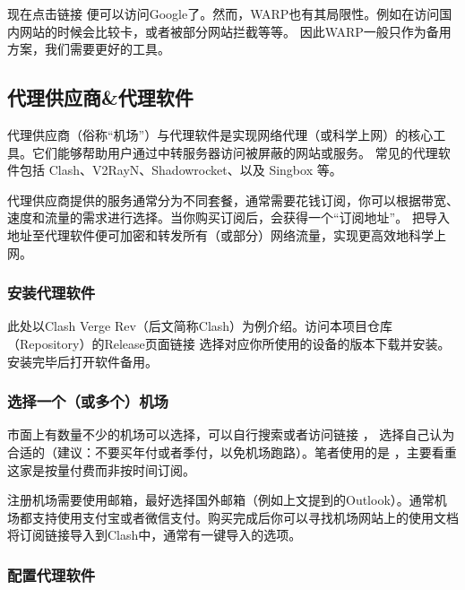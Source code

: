 现在点击链接 \href{https://google.com}{\color{black}\faLink} 便可以访问\textsf{Google}了。然而，\textsf{WARP}也有其局限性。例如在访问国内网站的时候会比较卡，或者被部分网站拦截等等。
因此WARP一般只作为备用方案，我们需要更好的工具。
\subsection{代理供应商\&代理软件}
代理供应商（俗称“机场”）与代理软件是实现网络代理（或科学上网）的核心工具。它们能够帮助用户通过中转服务器访问被屏蔽的网站或服务。
常见的代理软件包括 \textsf{Clash}、\textsf{V2RayN}、\textsf{Shadowrocket}、以及 \textsf{Singbox} 等。

代理供应商提供的服务通常分为不同套餐，通常需要花钱订阅，你可以根据带宽、速度和流量的需求进行选择。当你购买订阅后，会获得一个“订阅地址”。
把导入地址至代理软件便可加密和转发所有（或部分）网络流量，实现更高效地科学上网。

\subsubsection{安装代理软件}

此处以\textsf{Clash Verge Rev}（后文简称\textsf{Clash}）为例介绍。访问本项目仓库（Repository）的Release页面链接 \href{https://github.com/clash-verge-rev/clash-verge-rev/releases/tag/v1.7.7}{\color{black}\faLink} 
选择对应你所使用的设备的版本下载并安装。安装完毕后打开软件备用。

\subsubsection{选择一个（或多个）机场}

市面上有数量不少的机场可以选择，可以自行搜索或者访问链接 \href{https://github.com/hwanz/SSR-V2ray-Trojan}{\color{black}\faLink}，
选择自己认为合适的（建议：不要买年付或者季付，以免机场跑路）。笔者使用的是 \href{https://mojie.me}{\color{black}\faLink}，主要看重这家是按量付费而非按时间订阅。

注册机场需要使用邮箱，最好选择国外邮箱（例如上文提到的\textsf{Outlook}）。通常机场都支持使用支付宝或者微信支付。购买完成后你可以寻找机场网站上的使用文档将订阅链接导入到\textsf{Clash}中，通常有一键导入的选项。

\subsubsection{配置代理软件}

